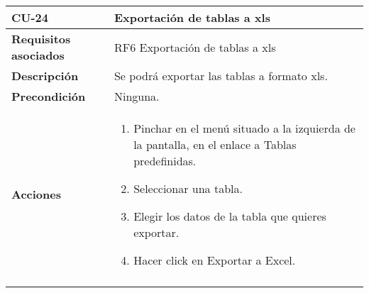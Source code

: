 \newpage
\begin{longtable}[t]{@{}ll@{}}
\toprule
\begin{minipage}[t]{0.23\columnwidth}\raggedright\strut
\textbf{CU-24}\strut
\end{minipage} & \begin{minipage}[b]{0.71\columnwidth}\raggedright\strut
\textbf{Exportación de tablas a xls}\strut
\end{minipage}\tabularnewline
\midrule
\endhead
\begin{minipage}[t]{0.23\columnwidth}\raggedright\strut
\textbf{Requisitos asociados}\strut
\end{minipage} & \begin{minipage}[t]{0.71\columnwidth}\raggedright\strut
RF6 Exportación de tablas a xls\strut
\end{minipage}\tabularnewline
\begin{minipage}[t]{0.23\columnwidth}\raggedright\strut
\textbf{Descripción}\strut
\end{minipage} & \begin{minipage}[t]{0.71\columnwidth}\raggedright\strut
Se podrá exportar las tablas a formato xls.
\strut
\end{minipage}\tabularnewline
\begin{minipage}[t]{0.23\columnwidth}\raggedright\strut
\textbf{Precondición}\strut
\end{minipage} & \begin{minipage}[t]{0.71\columnwidth}\raggedright\strut
Ninguna.\strut
\end{minipage}\tabularnewline
\begin{minipage}[t]{0.23\columnwidth}\raggedright\strut
\textbf{Acciones}\strut
\end{minipage} & \begin{minipage}[t]{0.71\columnwidth}\raggedright\strut
\begin{enumerate}
\def\labelenumi{\arabic{enumi}.}
\tightlist
\item
Pinchar en el menú situado a la izquierda de la pantalla, en el
enlace a Tablas predefinidas.
\item
Seleccionar una tabla.
\item
Elegir los datos de la tabla que quieres exportar.
\item
Hacer click en Exportar a Excel.
\end{enumerate}\strut
\end{minipage}\tabularnewline
\begin{minipage}[t]{0.23\columnwidth}\raggedright\strut

\end{minipage}
\end{longtable}
